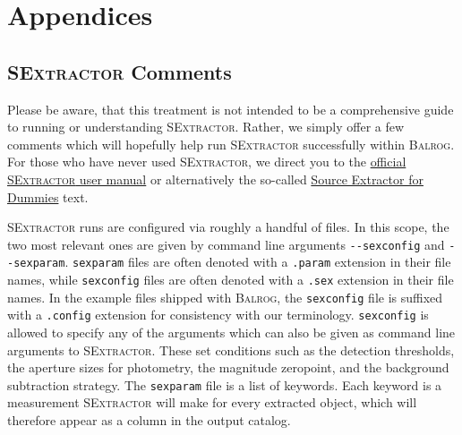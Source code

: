 \documentclass[11pt]{book}
\newcommand{\codett}[1]{\lstinline{#1}}
\newcommand{\balrog}{\textsc{Balrog}}
\newcommand{\sex}{\textsc{SExtractor}}
\newcommand{\opt}[1]{\codett{--#1}}
\begin{document}



\appendix
\chapter{Appendices}
\label{sec:appendix}

\section{\sex{} Comments}
\label{sec:quicksex}

Please be aware, that this treatment is not intended to be a comprehensive guide 
to running or understanding \sex{}.
Rather, we simply offer a few comments which will hopefully help run \sex{} successfully within \balrog{}.
For those who have never used \sex{}, we direct you to the
\href{https://www.astromatic.net/pubsvn/software/sextractor/trunk/doc/sextractor.pdf}{official \sex{} user manual} 
or alternatively the so-called
\href{http://astroa.physics.metu.edu.tr/MANUALS/sextractor/Guide2source\_extractor.pdf}{Source Extractor for Dummies} text.

\sex{} runs are configured via roughly a handful of files. 
In this scope, the two most relevant ones are given by command line arguments \opt{sexconfig}
and \opt{sexparam}. 
\codett{sexparam} files are often denoted with a \codett{.param} extension in their file names,
while \codett{sexconfig} files are often denoted with a \codett{.sex} extension in their file names.
In the example files shipped with \balrog{}, the \codett{sexconfig}
file is suffixed with a \codett{.config} extension for consistency with our terminology.
\codett{sexconfig} is allowed to specify any of the arguments which can
also be given as command line arguments to \sex{}.
These set conditions such as the detection thresholds,
the aperture sizes for photometry, the magnitude zeropoint,
and the background subtraction strategy.
The \codett{sexparam} file is a list of keywords.
Each keyword is a measurement \sex{} will make for every extracted object, which will therefore
appear as a column in the output catalog.
\end{document}
